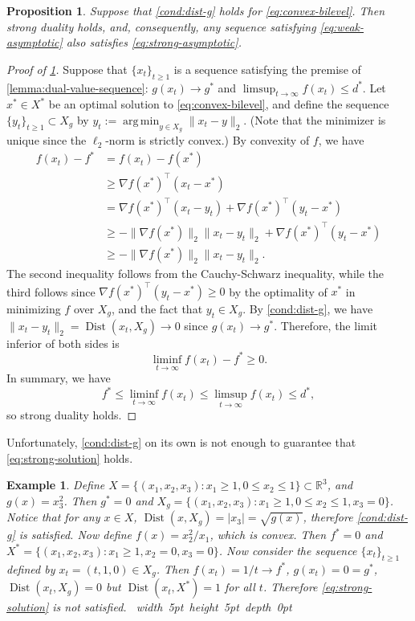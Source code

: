 \documentclass[11pt,oneside]{article}
\theoremstyle{plain}
\newtheorem{proposition}{Proposition}
\theoremstyle{plain}
\newtheorem{example}{Example}
\theoremstyle{plain}%
\DeclareMathOperator{\Dist}{Dist}
\newcommand{\epr}{\hfill\hbox{\hskip 4pt \vrule width 5pt height 5pt depth 0pt}\vspace{0.0cm}\par}
\newcommand{\grad}{\ensuremath{\nabla}}
\def\bbR{{\mathbb{R}}}
\DeclareMathOperator*{\argmin}{arg\,min}
\begin{document}
{\begin{proposition}\label{prop:dist-g-strong-duality}
Suppose that \cref{cond:dist-g} holds for \cref{eq:convex-bilevel}. Then strong duality holds, and, consequently, any sequence satisfying \cref{eq:weak-asymptotic} also satisfies \cref{eq:strong-asymptotic}.
\end{proposition}
\begin{proof}[Proof of \cref{prop:dist-g-strong-duality}]
Suppose that $\{x_t\}_{t \geq 1}$ is a sequence satisfying the premise of \cref{lemma:dual-value-sequence}: $g(x_t) \to g^*$ and $\limsup_{t \to \infty} f(x_t) \leq d^*$. Let $x^* \in X^*$ be an optimal solution to \cref{eq:convex-bilevel}, and define the sequence $\{y_t\}_{t \geq 1} \subset X_g$ by $y_t := \argmin_{y \in X_g} \|x_t - y\|_2$. (Note that the minimizer is unique since the $\ell_2$-norm is strictly convex.) By convexity of $f$, we have
\begin{align*}
f(x_t) - f^* &= f(x_t) - f(x^*)\\
&\geq \grad f(x^*)^\top (x_t - x^*)\\
&= \grad f(x^*)^\top (x_t - y_t) + \grad f(x^*)^\top (y_t - x^*)\\
&\geq -\|\grad f(x^*)\|_2 \|x_t - y_t\|_2 + \grad f(x^*)^\top (y_t - x^*)\\
&\geq -\|\grad f(x^*)\|_2 \|x_t - y_t\|_2.
\end{align*}
The second inequality follows from the Cauchy-Schwarz inequality, while the third follows since $\grad f(x^*)^\top (y_t - x^*) \geq 0$ by the optimality of $x^*$ in minimizing $f$ over $X_g$, and the fact that $y_t \in X_g$. By \cref{cond:dist-g}, we have $\|x_t - y_t\|_2 = \Dist(x_t,X_g) \to 0$ since $g(x_t) \to g^*$. Therefore, the limit inferior of both sides is
\[ \liminf_{t \to \infty} f(x_t) - f^* \geq 0. \]
In summary, we have
\[ f^* \leq \liminf_{t \to \infty} f(x_t) \leq \limsup_{t \to \infty} f(x_t) \leq d^*, \]
so strong duality holds.
\end{proof}
Unfortunately, \cref{cond:dist-g} on its own is not enough to guarantee that \cref{eq:strong-solution} holds.
\begin{example}\label{ex:counter-dist-g}
Define $X = \{(x_1,x_2,x_3) : x_1 \geq 1, 0 \leq x_2 \leq 1\} \subset \bbR^3$, and $g(x) = x_3^2$. Then $g^* = 0$ and $X_g = \{(x_1,x_2,x_3) : x_1 \geq 1, 0 \leq x_2 \leq 1, x_3 = 0\}$. Notice that for any $x \in X$, $\Dist(x,X_g) = |x_3| = \sqrt{g(x)}$, therefore \cref{cond:dist-g} is satisfied. Now define $f(x) = x_2^2/x_1$, which is convex. Then $f^* = 0$ and $X^* = \{(x_1,x_2,x_3) : x_1 \geq 1, x_2 = 0, x_3 = 0\}$. Now consider the sequence $\{x_t\}_{t \geq 1}$ defined by $x_t = (t,1,0) \in X_g$. Then $f(x_t) = 1/t \to f^*$, $g(x_t) = 0 = g^*$, $\Dist(x_t,X_g) = 0$ but $\Dist(x_t,X^*) = 1$ for all $t$. Therefore \cref{eq:strong-solution} is not satisfied.
\epr
\end{example}

}
\end{document}
